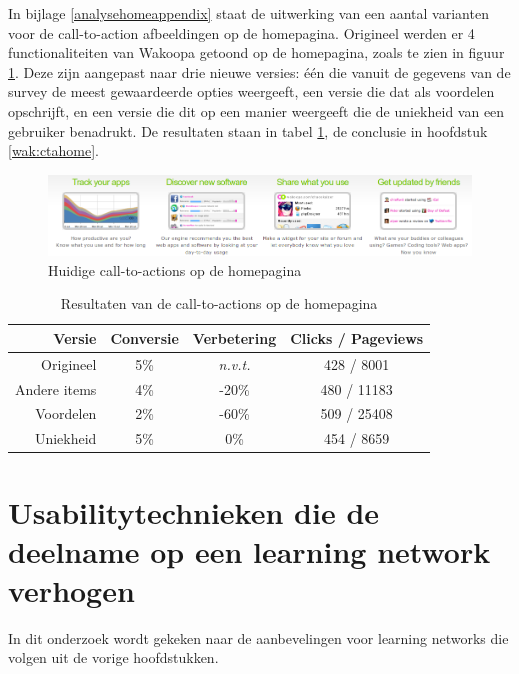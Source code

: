 \documentclass[a4paper, 10pt, pdftex]{report}
\begin{document}
      In bijlage \ref{analysehomeappendix} staat de uitwerking van een aantal varianten voor de call-to-action afbeeldingen op de homepagina. Origineel werden er 4 functionaliteiten van Wakoopa getoond op de homepagina, zoals te zien in figuur \ref{ctahomeimg}. Deze zijn aangepast naar drie nieuwe versies: \'e\'en die vanuit de gegevens van de survey de meest gewaardeerde opties weergeeft, een versie die dat als voordelen opschrijft, en een versie die dit op een manier weergeeft die de uniekheid van een gebruiker benadrukt. De resultaten staan in tabel \ref{tab:ctahome}, de conclusie in hoofdstuk \ref{wak:ctahome}.
    \begin{figure}
      \begin{center}
        \includegraphics[width=\textwidth]{../images/newhomepage/original}
        \caption{Huidige call-to-actions op de homepagina}
        \label{ctahomeimg}
      \end{center}
    \end{figure}

        \begin{table}[ht]
        \centering
        \begin{tabular}{r|*{3}{c}}
          \textbf{Versie}                   & Conversie  & Verbetering    & Clicks / Pageviews \\ \hline
          Origineel                         & 5\%        & \emph{n.v.t.}  & 428 / 8001\\
          Andere items                      & 4\%        & -20\%          & 480 / 11183\\
          Voordelen                         & 2\%        & -60\%          & 509 / 25408\\
          Uniekheid                         & 5\%        & 0\%            & 454 / 8659\\
        \end{tabular}
        \caption{Resultaten van de call-to-actions op de homepagina}
        \label{tab:ctahome}
        \end{table}

  \newpage
  \chapter{Usabilitytechnieken die de deelname op een learning network verhogen}
    \label{globalchapter}
    In dit onderzoek wordt gekeken naar de aanbevelingen voor learning networks die volgen uit de vorige hoofdstukken.
\end{document}
